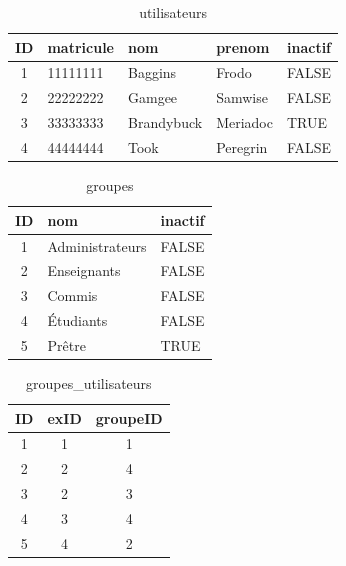 \documentclass[letter, 11pt]{report}
\begin{document}
\begin{table}[h!]
	\caption{utilisateurs}
	\begin{center}
		\begin{tabular}{|c|l|l|l|l|}
			\hline
			ID & matricule & nom         & prenom   & inactif \\
			\hline
			1  & 11111111  & Baggins     & Frodo    & FALSE \\
			2  & 22222222  & Gamgee      & Samwise  & FALSE \\
			3  & 33333333  & Brandybuck  & Meriadoc & TRUE \\
			4  & 44444444  & Took        & Peregrin & FALSE \\
			\hline
		\end{tabular}
	\end{center}
\end{table}

\begin{table}[h!]
	\caption{groupes}
	\begin{center}
		\begin{tabular}{|c|l|l|}
			\hline
			ID & nom               & inactif \\
			\hline
			1  & Administrateurs   & FALSE \\
			2  & Enseignants       & FALSE \\
			3  & Commis            & FALSE \\
			4  & Étudiants         & FALSE \\
			5  & Prêtre            & TRUE \\
			\hline
		\end{tabular}
	\end{center}
\end{table}

\begin{table}[h!]
	\caption{groupes\_utilisateurs}
	\begin{center}
		\begin{tabular}{|c|c|c|}
			\hline
			ID & exID & groupeID \\
			\hline
			1  & 1    & 1 \\
			2  & 2    & 4 \\
			3  & 2    & 3 \\
			4  & 3    & 4 \\
			5  & 4    & 2 \\
			\hline
		\end{tabular}
	\end{center}
\end{table}
\end{document}
